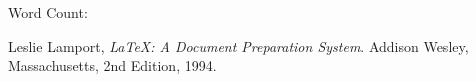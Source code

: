 \documentclass[12pt,a4paper]{article}
\begin{document}
Word Count: %



\renewcommand{\refname}{Bibliography}
\begin{thebibliography}{9}

  Leslie Lamport,
  \emph{\LaTeX: A Document Preparation System}.
  Addison Wesley, Massachusetts,
  2nd Edition,
  1994.

\end{thebibliography}
\end{document}

